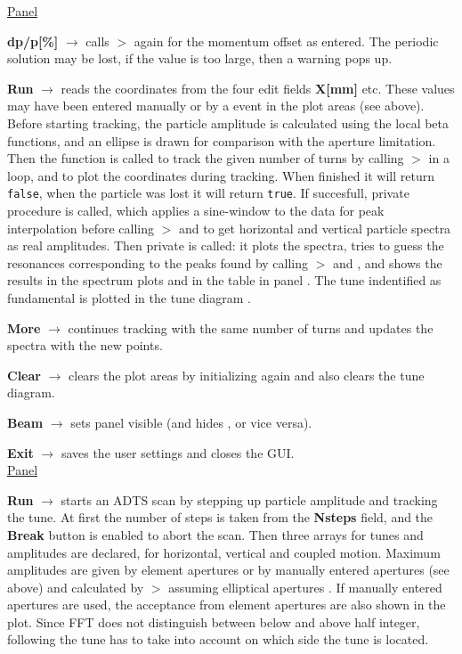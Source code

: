 \documentclass[12pt]{article}
\newcommand\code[1]{{\tt #1}}
\newcommand{\ofld}[1]{\colorbox{black!15}{{{\color{black}\bf #1}}}}
\newcommand\guico[1]{{\color{blue}\code{#1}}}
\newcommand\guifco[1]{{\color{violet}\code{#1}}}
\newcommand{\unico}[1]{{\color{burntorange}\code{#1}}}
\newcommand{\evcod}[2]{\ofld{#1} $\rightarrow$ \guico{#2}}
\newcommand{\prcod}[2]{\opauni{#1}$>$\unico{#2}}
\newcommand{\opagui}[1]{\colorbox{blue!20}{{\color{black}\code{#1}}}}
\newcommand{\ogui}[1]{\hyperref[#1]{\opagui{#1}}}
\newcommand{\opaguif}[1]{\colorbox{violet!30}{{\color{black}\code{#1}}}}
\newcommand{\oguif}[1]{\hyperref[#1]{\opaguif{#1}}}
\newcommand{\opauni}[1]{\colorbox{orange!30}{{\color{black}\code{#1}}}}
\begin{document}
\underline{Panel \guico{PanCtrl}}

\evcod{dp/p[\%]}{ediAction[edidpp]} calls \prcod{tracklib}{Initdpp} again for the momentum offset as entered. The periodic solution may be lost, if the value is too large, then a warning pops up. 

\evcod{Run}{butRunClick} reads the coordinates from the four edit fields \ofld{X[mm]} etc. These values may have been entered manually or by a \guifco{pMouseDown} event in the \guico{psx,psy} plot areas (see \oguif{comfigureframe} above). Before starting tracking, the particle amplitude is calculated using the local beta functions, and an ellipse is drawn for comparison with the aperture limitation. Then the function \guico{Track} is called to track the given number of turns by calling 
\prcod{tracklib}{Oneturn} in a loop, and to plot the coordinates during tracking. When finished it will return \code{false}, when the particle was lost it will return \code{true}. If succesfull, private procedure \guico{Spectrum} is called, which applies a sine-window to the data for peak interpolation before calling \prcod{tracklib}{TWOFFT} and \unico{FFTtoAmp} to get horizontal and vertical particle spectra as real amplitudes. Then private \guico{FFTplot} is called: it plots the spectra, tries to guess the resonances corresponding to the peaks found by calling \prcod{tracklib}{FindPeaks} and \unico{ResoGuess}, and shows the results in the spectrum plots and in the table \guico{resgrid} in panel \guico{PanRes}. The tune indentified as fundamental is plotted in the tune diagram \ogui{opatunediag}.

\evcod{More}{butMoreClick} continues tracking with the same number of turns and updates the spectra with the new points.

\evcod{Clear}{butClearClick} clears the plot areas by initializing again and also clears the tune diagram.

\evcod{Beam}{butBeamClick} sets panel \guico{PanBeam} visible (and hides \guico{PanTush}, or vice versa).

\evcod{Exit}{butExitClick} saves the user settings and closes the GUI.\\[1ex]

\underline{Panel \guico{PanTush}}

\evcod{Run}{butTushClick} starts an ADTS scan by stepping up particle amplitude and tracking the tune. At first the number of steps is taken from the \ofld{Nsteps} field, and the \ofld{Break} button is enabled to abort the scan. Then three arrays for tunes and amplitudes are declared, for horizontal, vertical and coupled motion. Maximum amplitudes are given by element apertures or by manually entered apertures (see above) and calculated by \prcod{tracklib}{AmpKappa} assuming elliptical apertures \cite{inside}.  If manually entered apertures are used, the acceptance from element apertures are also shown in the plot. Since FFT does not distinguish between below and above half integer, following the tune has to take into account on which side the tune is located.
\end{document}
